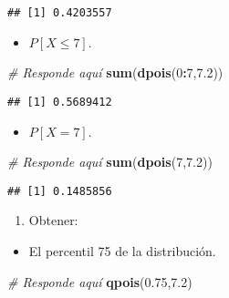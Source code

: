 \documentclass[
]{article}
\newenvironment{Shaded}{\begin{snugshade}}{\end{snugshade}}
\newcommand{\CommentTok}[1]{\textcolor[rgb]{0.56,0.35,0.01}{\textit{#1}}}
\newcommand{\DecValTok}[1]{\textcolor[rgb]{0.00,0.00,0.81}{#1}}
\newcommand{\FloatTok}[1]{\textcolor[rgb]{0.00,0.00,0.81}{#1}}
\newcommand{\KeywordTok}[1]{\textcolor[rgb]{0.13,0.29,0.53}{\textbf{#1}}}
\newcommand{\NormalTok}[1]{#1}
\newcommand{\OperatorTok}[1]{\textcolor[rgb]{0.81,0.36,0.00}{\textbf{#1}}}
\providecommand{\tightlist}{%
  \setlength{\itemsep}{0pt}\setlength{\parskip}{0pt}}
\begin{document}
\begin{verbatim}
## [1] 0.4203557
\end{verbatim}

\begin{itemize}
\tightlist
\item
  \(P[X \leq 7]\).
\end{itemize}

\begin{Shaded}
\begin{Highlighting}[]
\CommentTok{# Responde aquí}
\KeywordTok{sum}\NormalTok{(}\KeywordTok{dpois}\NormalTok{(}\DecValTok{0}\OperatorTok{:}\DecValTok{7}\NormalTok{,}\FloatTok{7.2}\NormalTok{))}
\end{Highlighting}
\end{Shaded}

\begin{verbatim}
## [1] 0.5689412
\end{verbatim}

\begin{itemize}
\tightlist
\item
  \(P[X = 7]\).
\end{itemize}

\begin{Shaded}
\begin{Highlighting}[]
\CommentTok{# Responde aquí}
\KeywordTok{sum}\NormalTok{(}\KeywordTok{dpois}\NormalTok{(}\DecValTok{7}\NormalTok{,}\FloatTok{7.2}\NormalTok{))}
\end{Highlighting}
\end{Shaded}

\begin{verbatim}
## [1] 0.1485856
\end{verbatim}

\begin{enumerate}
\def\labelenumi{\arabic{enumi}.}
\setcounter{enumi}{1}
\tightlist
\item
  Obtener:
\end{enumerate}

\begin{itemize}
\tightlist
\item
  El percentil 75 de la distribución.
\end{itemize}

\begin{Shaded}
\begin{Highlighting}[]
\CommentTok{# Responde aquí}
\KeywordTok{qpois}\NormalTok{(}\FloatTok{0.75}\NormalTok{,}\FloatTok{7.2}\NormalTok{)}
\end{Highlighting}
\end{Shaded}
\end{document}
